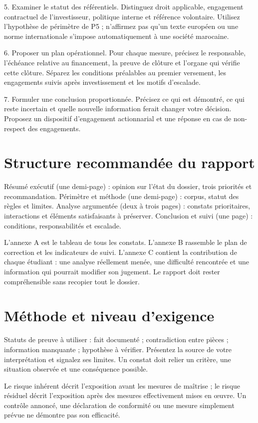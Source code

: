\documentclass[11pt,a4paper]{article}
\begin{document}
5. Examiner le statut des référentiels. Distinguez droit applicable, engagement contractuel de l’investisseur, politique interne et référence volontaire. Utilisez l’hypothèse de périmètre de P5 ; n’affirmez pas qu’un texte européen ou une norme internationale s’impose automatiquement à une société marocaine.

6. Proposer un plan opérationnel. Pour chaque mesure, précisez le responsable, l’échéance relative au financement, la preuve de clôture et l’organe qui vérifie cette clôture. Séparez les conditions préalables au premier versement, les engagements suivis après investissement et les motifs d’escalade.

7. Formuler une conclusion proportionnée. Précisez ce qui est démontré, ce qui reste incertain et quelle nouvelle information ferait changer votre décision. Proposez un dispositif d’engagement actionnarial et une réponse en cas de non-respect des engagements.

\section{Structure recommandée du rapport}
Résumé exécutif (une demi-page) : opinion sur l’état du dossier, trois priorités et recommandation. Périmètre et méthode (une demi-page) : corpus, statut des règles et limites. Analyse argumentée (deux à trois pages) : constats prioritaires, interactions et éléments satisfaisants à préserver. Conclusion et suivi (une page) : conditions, responsabilités et escalade.

L’annexe A est le tableau de tous les constats. L’annexe B rassemble le plan de correction et les indicateurs de suivi. L’annexe C contient la contribution de chaque étudiant : une analyse réellement menée, une difficulté rencontrée et une information qui pourrait modifier son jugement. Le rapport doit rester compréhensible sans recopier tout le dossier.

\section{Méthode et niveau d’exigence}
Statuts de preuve à utiliser : fait documenté ; contradiction entre pièces ; information manquante ; hypothèse à vérifier. Présentez la source de votre interprétation et signalez ses limites. Un constat doit relier un critère, une situation observée et une conséquence possible.

Le risque inhérent décrit l’exposition avant les mesures de maîtrise ; le risque résiduel décrit l’exposition après des mesures effectivement mises en œuvre. Un contrôle annoncé, une déclaration de conformité ou une mesure simplement prévue ne démontre pas son efficacité.
\end{document}
